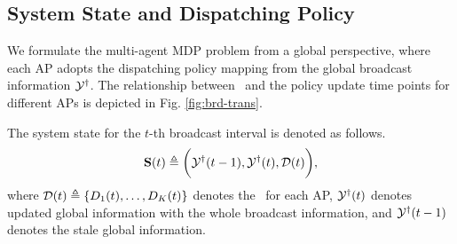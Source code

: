 \subsection{System State and Dispatching Policy}
We formulate the multi-agent MDP problem from a global perspective, where each AP adopts the dispatching policy mapping from the global broadcast information $\mathcal{Y}^{\dagger}$.
The relationship between \brlatency~and the policy update time points for different APs is depicted in Fig. \ref{fig:brd-trans}.

\begin{definition}
    The system state for the $t$-th broadcast interval is denoted as follows.
    \begin{align}
        \mathbf{S}({t}) \triangleq \bigg(
            \mathcal{Y}^{\dagger}({t-1}), \mathcal{Y}^{\dagger}({t}), \mathcal{D}({t})
        \bigg),
    \end{align}
    where $\mathcal{D}({t}) \triangleq \{D_{1}({t}), \dots, D_{K}({t})\}$ denotes the \brlatency~for each AP, $\mathcal{Y}^{\dagger}({t})$ denotes updated global information with the whole broadcast information, and $\mathcal{Y}^{\dagger}({t-1})$ denotes the stale global information.
\end{definition}


